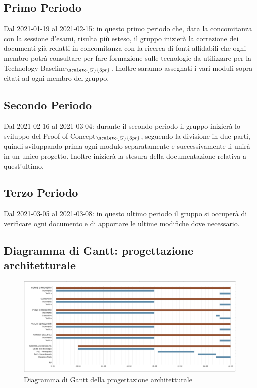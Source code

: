 \begin{itemize}
\begin{itemize}
	\end{itemize}
\end{itemize}
\subsection{Primo Periodo}\label{PianificazioneProgettazioneArchitetturalePrimoPeriodo}
Dal 2021-01-19 al 2021-02-15: in questo primo periodo che, data la concomitanza con la sessione d'esami, risulta più esteso,  il gruppo inizierà la correzione dei documenti già redatti in concomitanza con la ricerca di fonti affidabili che ogni membro potrà consultare per fare formazione sulle tecnologie da utilizzare per la Technology Baseline$_{\scaleto{G}{3pt}}$. Inoltre saranno assegnati i vari moduli sopra citati ad ogni membro del gruppo.
\subsection{Secondo Periodo}\label{PianificazioneProgettazioneArchitetturaleSecondoPeriodo}
Dal 2021-02-16 al 2021-03-04: durante il secondo periodo il gruppo inizierà lo sviluppo del Proof of Concept$_{\scaleto{G}{3pt}}$, seguendo la divisione in due parti, quindi sviluppando prima ogni modulo separatamente e successivamente li unirà in un unico progetto. Inoltre inizierà la stesura della documentazione relativa a quest'ultimo.
\subsection{Terzo Periodo}\label{PianificazioneProgettazioneArchitetturaleTerzoPeriodo}
Dal 2021-03-05 al 2021-03-08: in questo ultimo periodo il gruppo si occuperà di verificare ogni documento e di apportare le ultime modifiche dove necessario.

\subsection{Diagramma di Gantt: progettazione architetturale}\label{PianificazioneDiagrammaDiGanttProgettazioneArchitetturale}
\begin{figure}[h]
	\begin{center}
		\includegraphics[width=0.9\linewidth]{../immagini/pdp/gantt_progettazione_architetturale2.png}
		\caption{Diagramma di Gantt della progettazione architetturale}
	\end{center}
\end{figure}
\clearpage
